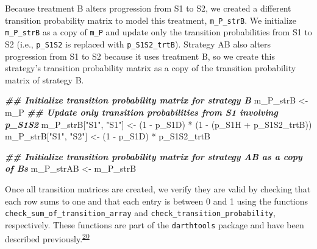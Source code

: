 \documentclass[
]{article}
\newenvironment{Shaded}{\begin{snugshade}}{\end{snugshade}}
\newcommand{\DecValTok}[1]{\textcolor[rgb]{0.00,0.00,0.81}{#1}}
\newcommand{\DocumentationTok}[1]{\textcolor[rgb]{0.56,0.35,0.01}{\textbf{\textit{#1}}}}
\newcommand{\NormalTok}[1]{#1}
\newcommand{\OtherTok}[1]{\textcolor[rgb]{0.56,0.35,0.01}{#1}}
\newcommand{\SpecialCharTok}[1]{\textcolor[rgb]{0.00,0.00,0.00}{#1}}
\newcommand{\StringTok}[1]{\textcolor[rgb]{0.31,0.60,0.02}{#1}}
\begin{document}
Because treatment B alters progression from S1 to S2, we created a different transition probability matrix to model this treatment, \texttt{m\_P\_strB}. We initialize \texttt{m\_P\_strB} as a copy of \texttt{m\_P} and update only the transition probabilities from S1 to S2 (i.e., \texttt{p\_S1S2} is replaced with \texttt{p\_S1S2\_trtB}). Strategy AB also alters progression from S1 to S2 because it uses treatment B, so we create this strategy's transition probability matrix as a copy of the transition probability matrix of strategy B.

\begin{Shaded}
\begin{Highlighting}[]
\DocumentationTok{\#\# Initialize transition probability matrix for strategy B}
\NormalTok{m\_P\_strB }\OtherTok{\textless{}{-}}\NormalTok{ m\_P}
\DocumentationTok{\#\# Update only transition probabilities from S1 involving p\_S1S2}
\NormalTok{m\_P\_strB[}\StringTok{"S1"}\NormalTok{, }\StringTok{"S1"}\NormalTok{] }\OtherTok{\textless{}{-}}\NormalTok{ (}\DecValTok{1} \SpecialCharTok{{-}}\NormalTok{ p\_S1D) }\SpecialCharTok{*}\NormalTok{ (}\DecValTok{1} \SpecialCharTok{{-}}\NormalTok{ (p\_S1H }\SpecialCharTok{+}\NormalTok{ p\_S1S2\_trtB))}
\NormalTok{m\_P\_strB[}\StringTok{"S1"}\NormalTok{, }\StringTok{"S2"}\NormalTok{] }\OtherTok{\textless{}{-}}\NormalTok{ (}\DecValTok{1} \SpecialCharTok{{-}}\NormalTok{ p\_S1D) }\SpecialCharTok{*}\NormalTok{ p\_S1S2\_trtB}

\DocumentationTok{\#\# Initialize transition probability matrix for strategy AB as a copy of B\textquotesingle{}s}
\NormalTok{m\_P\_strAB }\OtherTok{\textless{}{-}}\NormalTok{ m\_P\_strB}
\end{Highlighting}
\end{Shaded}

Once all transition matrices are created, we verify they are valid by checking that each row sums to one and that each entry is between 0 and 1 using the functions \texttt{check\_sum\_of\_transition\_array} and \texttt{check\_transition\_probability}, respectively. These functions are part of the \texttt{darthtools} package and have been described previously.\textsuperscript{\protect\hyperlink{ref-Alarid-Escudero2019e}{20}}
\end{document}
